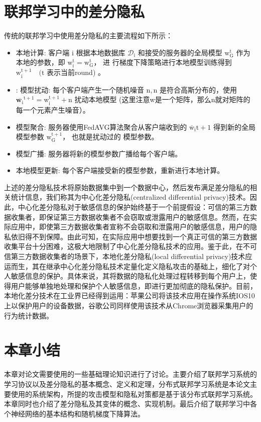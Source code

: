 \section{联邦学习中的差分隐私}
传统的联邦学习中使用差分隐私的主要流程如下所示：
\begin{itemize}
\item 本地计算:
客户端 $\mathrm{i}$ 根据本地数据库 $\mathcal{D}_{\mathrm{i}}$ 和接受的服务器的全局模型 $\mathrm{w}_{\mathrm{G}}^{\mathrm{t}}$ 作为本地的参数，即 $\mathrm{w}_{\mathrm{i}}^{\mathrm{t}}=\mathrm{w}_{\mathrm{G}}^{\mathrm{t}}$， 进 行梯度下降策略进行本地模型训练得到 $\mathrm{w}_{\mathrm{i}}^{\mathrm{t}+1} \quad(\mathrm{t}$ 表示当前round) 。

\item: 模型扰动:
每个客户端产生一个随机噪音 $\mathrm{n},\mathrm{n}$ 是符合高斯分布的，使用 $\overline{\mathbf{w}_{\mathrm{i}}}^{\mathrm{t}+1}=\mathrm{w}_{\mathrm{i}}^{\mathrm{t}+1}+\mathrm{n}$ 扰动本地模型 (这里注意w是一个矩阵，那么n就对矩阵的每一个元素产生噪音）。

\item 模型聚合:
服务器使用FedAVG算法聚合从客户端收到的 $\overline{\mathrm{w}}_{\mathrm{i}} \mathrm{t}+1$ 得到新的全局模型参数 $\mathrm{w}_{\mathrm{G}}^{\mathrm{t}+1}$， 也就是扰动过的 模型参数。

\item 模型广播:
服务器将新的模型参数广播给每个客户端。

\item 本地模型更新:
每个客户端接受新的模型参数，重新进行本地计算。
\end{itemize}

上述的差分隐私技术将原始数据集中到一个数据中心，然后发布满足差分隐私的相关统计信息，我们称其为中心化差分隐私(centralized differential privacy)技术。因此，中心化差分隐私对于敏感信息的保护始终基于一个前提假设：可信的第三方数据收集者，即保证第三方数据收集者不会窃取或泄露用户的敏感信息。然而，在实际应用中，即使第三方数据收集者宣称不会窃取和泄露用户的敏感信息，用户的隐私依旧得不到保障。由此可知，在实际应用中想要找到一个真正可信的第三方数据收集平台十分困难，这极大地限制了中心化差分隐私技术的应用。鉴于此，在不可信第三方数据收集者的场景下，本地化差分隐私(local differential privacy)技术应运而生，其在继承中心化差分隐私技术定量化定义隐私攻击的基础上，细化了对个人敏感信息的保护。具体来说，其将数据的隐私化处理过程转移到每个用户上，使得用户能够单独地处理和保护个人敏感信息，即进行更加彻底的隐私保护。目前，本地化差分技术在工业界已经得到运用：苹果公司将该技术应用在操作系统IOS10上以保护用户的设备数据，谷歌公司同样使用该技术从Chrome浏览器采集用户的行为统计数据。


\section{本章小结}
本章对论文需要使用的一些基础理论知识进行了讨论。主要介绍了联邦学习系统的学习协议以及差分隐私的基本概念、定义和定理，分布式联邦学习系统是本论文主要使用的系统架构，所提的攻击模型和隐私对策都是基于该分布式联邦学习系统。本章同时也介绍了差分隐私及其变体的概念、实现机制。最后介绍了联邦学习中各个神经网络的基本结构和随机梯度下降算法。
